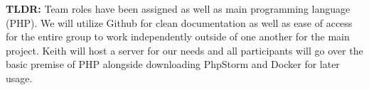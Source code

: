 \textbf{TLDR:} Team roles have been assigned as well as main programming language (PHP).
We will utilize Github for clean documentation as well as ease of access for the entire group
to work independently outside of one another for the main project. Keith will host
a server for our needs and all participants will go over the basic premise of PHP alongside
downloading PhpStorm and Docker for later usage.